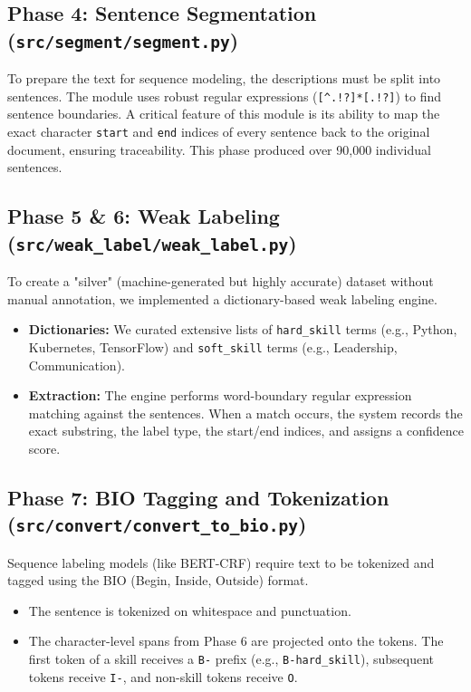 \documentclass[11pt, a4paper]{article}
\begin{document}
\subsection{Phase 4: Sentence Segmentation (\texttt{src/segment/segment.py})}
To prepare the text for sequence modeling, the descriptions must be split into sentences. The module uses robust regular expressions (\texttt{[\textasciicircum.!?]*[.!?]}) to find sentence boundaries. A critical feature of this module is its ability to map the exact character \texttt{start} and \texttt{end} indices of every sentence back to the original document, ensuring traceability. This phase produced over 90,000 individual sentences.

\subsection{Phase 5 \& 6: Weak Labeling (\texttt{src/weak\_label/weak\_label.py})}
To create a "silver" (machine-generated but highly accurate) dataset without manual annotation, we implemented a dictionary-based weak labeling engine. 
\begin{itemize}
    \item \textbf{Dictionaries:} We curated extensive lists of \texttt{hard\_skill} terms (e.g., Python, Kubernetes, TensorFlow) and \texttt{soft\_skill} terms (e.g., Leadership, Communication).
    \item \textbf{Extraction:} The engine performs word-boundary regular expression matching against the sentences. When a match occurs, the system records the exact substring, the label type, the start/end indices, and assigns a confidence score.
\end{itemize}

\subsection{Phase 7: BIO Tagging and Tokenization (\texttt{src/convert/convert\_to\_bio.py})}
Sequence labeling models (like BERT-CRF) require text to be tokenized and tagged using the BIO (Begin, Inside, Outside) format.
\begin{itemize}
    \item The sentence is tokenized on whitespace and punctuation.
    \item The character-level spans from Phase 6 are projected onto the tokens. The first token of a skill receives a \texttt{B-} prefix (e.g., \texttt{B-hard\_skill}), subsequent tokens receive \texttt{I-}, and non-skill tokens receive \texttt{O}.
\end{itemize}
\end{document}

